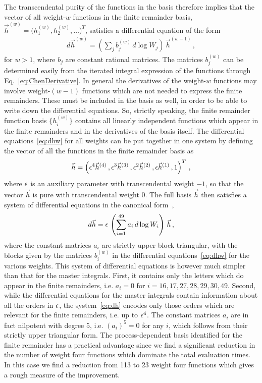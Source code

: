 \documentclass[main.tex]{subfiles}
\begin{document}
The transcendental purity of the functions in the basis therefore implies that the vector of all weight-$w$ functions in the finite remainder basis, $\vec{h}^{(w)}= \bigl(h^{(w)}_1, h^{(w)}_2, \ldots \bigr)^T$, satisfies a differential equation of the form
\begin{align} \label{eq:dhw}
d \vec{h}^{(w)} = \left( \sum_{j} b_j^{(w)} \, d\log W_j  \right) \,  \vec{h}^{(w-1)} \,,
\end{align}
for $w>1$, where $b_j$ are constant rational matrices. The matrices $b_j^{(w)}$ can be determined easily from the iterated integral expression of the functions through Eq.~\eqref{eq:ChenDerivative}. 
In general the derivatives of the weight-$w$ functions may involve weight-$(w-1)$ functions which are not needed to express the finite remainders. These must be included in the basis as well, in order to be able to write down the differential equations. So, strictly speaking, the finite remainder function basis $\{h^{(w)}_i\}$ contains all linearly independent functions which appear in the finite remainders and in the derivatives of the basis itself.
The differential equations~\eqref{eq:dhw} for all weights can be put together in one system by defining the vector of all the functions in the finite remainder basis as
\begin{align}
\vec{h} = \left( \epsilon^4 \vec{h}^{(4)}\,, \epsilon^3 \vec{h}^{(3)}\,, \epsilon^2 \vec{h}^{(2)} \,, \epsilon \vec{h}^{(1)} \,, 1 \right)^T \,,
\end{align}
where $\epsilon$ is an auxiliary parameter with transcendental weight $-1$, so that the vector $\vec{h}$ is pure with transcendental weight $0$. The full basis $\vec{h}$ then satisfies a system of differential equations in the canonical form~\cite{Henn:2013pwa},
\begin{align} \label{eq:dh}
d \vec{h} = \epsilon \, \left(  \sum_{i=1}^{49} a_i \, d\log W_i \right) \, \vec{h} \,,
\end{align}
where the constant matrices $a_i$ are strictly upper block triangular, with the blocks given by the matrices $b_i^{(w)}$ in the differential equations~\eqref{eq:dhw} for the various weights.
This system of differential equations is however much simpler than that for the master integrals. First, it contains only the letters which do appear in the finite remainders, i.e. $a_i = 0$ for $i=16,17,27,28,29,30,49$. Second, while the differential equations for the master integrals contain information about all the orders in $\epsilon$, the system~\eqref{eq:dh} encodes only those orders which are relevant for the finite remainders, i.e. up to $\epsilon^4$. The constant matrices $a_i$ are in fact nilpotent with degree $5$, i.e. $(a_i)^5 = 0$ for any $i$, which follows from their strictly upper triangular form. The process-dependent basis identified for the finite remainder has a practical advantage since we find a significant reduction in the number of weight four functions which dominate the total evaluation times. In this case we find a reduction from 113 to 23 weight four functions which gives a rough measure of the improvement.
\end{document}
